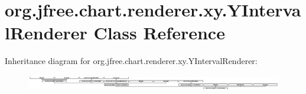 \hypertarget{classorg_1_1jfree_1_1chart_1_1renderer_1_1xy_1_1_y_interval_renderer}{}\section{org.\+jfree.\+chart.\+renderer.\+xy.\+Y\+Interval\+Renderer Class Reference}
\label{classorg_1_1jfree_1_1chart_1_1renderer_1_1xy_1_1_y_interval_renderer}
Inheritance diagram for org.\+jfree.\+chart.\+renderer.\+xy.\+Y\+Interval\+Renderer\+:\begin{figure}[H]
\begin{center}
\leavevmode
\includegraphics[height=0.706625cm]{classorg_1_1jfree_1_1chart_1_1renderer_1_1xy_1_1_y_interval_renderer}
\end{center}
\end{figure}
